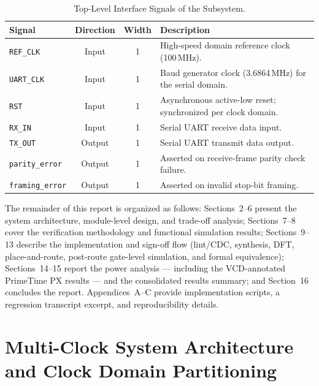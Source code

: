\documentclass[11pt,a4paper]{article}
\begin{document}
\begin{table}[H]
\centering
\caption{Top-Level Interface Signals of the Subsystem.}
\label{tab:io_ports}
\renewcommand{\arraystretch}{1.3}
\begin{tabularx}{\textwidth}{|l|c|c|Y|}
\hline
\textbf{Signal} & \textbf{Direction} & \textbf{Width} & \textbf{Description} \\
\hline
\texttt{REF\_CLK} & Input & 1 & High-speed domain reference clock (100\,MHz). \\
\hline
\texttt{UART\_CLK} & Input & 1 & Baud generator clock (3.6864\,MHz) for the serial domain. \\
\hline
\texttt{RST} & Input & 1 & Asynchronous active-low reset; synchronized per clock domain. \\
\hline
\texttt{RX\_IN} & Input & 1 & Serial UART receive data input. \\
\hline
\texttt{TX\_OUT} & Output & 1 & Serial UART transmit data output. \\
\hline
\texttt{parity\_error} & Output & 1 & Asserted on receive-frame parity check failure. \\
\hline
\texttt{framing\_error} & Output & 1 & Asserted on invalid stop-bit framing. \\
\hline
\end{tabularx}
\end{table}

The remainder of this report is organized as follows: Sections~2--6 present the system architecture, module-level design, and trade-off analysis; Sections~7--8 cover the verification methodology and functional simulation results; Sections~9--13 describe the implementation and sign-off flow (lint/CDC, synthesis, DFT, place-and-route, post-route gate-level simulation, and formal equivalence); Sections~14--15 report the power analysis --- including the VCD-annotated PrimeTime PX results --- and the consolidated results summary; and Section~16 concludes the report. Appendices~A--C provide implementation scripts, a regression transcript excerpt, and reproducibility details.

\section{Multi-Clock System Architecture and Clock Domain Partitioning}
\end{document}
